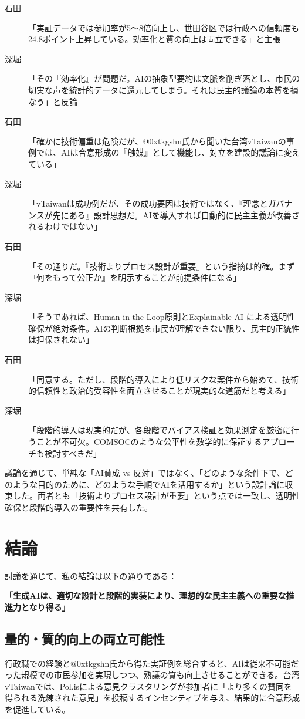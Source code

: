 \documentclass[12pt,a4j]{jarticle}
\begin{document}
\begin{description}
\item[石田] 「実証データでは参加率が5～8倍向上し、世田谷区では行政への信頼度も24.8ポイント上昇している\cite{setagaya2023}。効率化と質の向上は両立できる」と主張
\item[深堀] 「その『効率化』が問題だ。AIの抽象型要約は文脈を削ぎ落とし、市民の切実な声を統計的データに還元してしまう。それは民主的議論の本質を損なう\cite{panditharatne2023}」と反論
\item[石田] 「確かに技術偏重は危険だが、@0xtkgshn氏から聞いた台湾vTaiwanの事例では、AIは合意形成の『触媒』として機能し、対立を建設的議論に変えている\cite{cui2024}」
\item[深堀] 「vTaiwanは成功例だが、その成功要因は技術ではなく、『理念とガバナンスが先にある』設計思想だ。AIを導入すれば自動的に民主主義が改善されるわけではない」
\item[石田] 「その通りだ。『技術よりプロセス設計が重要』という指摘は的確。まず『何をもって公正か』を明示することが前提条件になる」
\item[深堀] 「そうであれば、Human-in-the-Loop原則とExplainable AI による透明性確保が絶対条件。AIの判断根拠を市民が理解できない限り、民主的正統性は担保されない」
\item[石田] 「同意する。ただし、段階的導入により低リスクな案件から始めて、技術的信頼性と政治的受容性を両立させることが現実的な道筋だと考える」
\item[深堀] 「段階的導入は現実的だが、各段階でバイアス検証と効果測定を厳密に行うことが不可欠。COMSOCのような公平性を数学的に保証するアプローチも検討すべきだ」
\end{description}

議論を通じて、単純な「AI賛成 vs 反対」ではなく、「どのような条件下で、どのような目的のために、どのような手順でAIを活用するか」という設計論に収束した。両者とも「技術よりプロセス設計が重要」という点では一致し、透明性確保と段階的導入の重要性を共有した。

\section{結論}

討議を通じて、私の結論は以下の通りである：

\textbf{「生成AIは、適切な設計と段階的実装により、理想的な民主主義への重要な推進力となり得る」}

\subsection{量的・質的向上の両立可能性}
行政職での経験と@0xtkgshn氏から得た実証例を総合すると、AIは従来不可能だった規模での市民参加を実現しつつ、熟議の質も向上させることができる。台湾vTaiwanでは、Pol.isによる意見クラスタリングが参加者に「より多くの賛同を得られる洗練された意見」を投稿するインセンティブを与え、結果的に合意形成を促進している\cite{tsai2024}。
\end{document}
